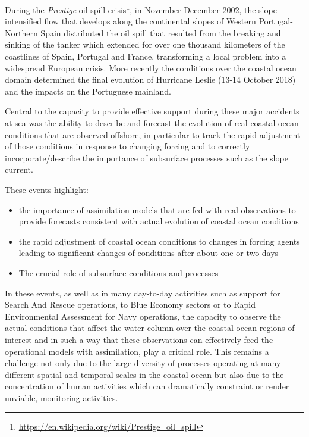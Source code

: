 During the \emph{Prestige} oil spill
crisis\footnote{\url{https://en.wikipedia.org/wiki/Prestige_oil_spill}},
in November-December 2002, the slope intensified flow that develops
along the continental slopes of Western Portugal-Northern Spain
distributed the oil spill that resulted from the breaking and sinking
of the tanker which extended for over one thousand kilometers of the
coastlines of Spain, Portugal and France, transforming a local problem
into a widespread European crisis. More recently the conditions over
the coastal ocean domain determined the final evolution of Hurricane
Leslie (13-14 October 2018) and the impacts on the Portuguese
mainland.
 
Central to the capacity to provide effective support during these
major accidents at sea was the ability to describe and forecast the
evolution of real coastal ocean conditions that are observed offshore,
in particular to track the rapid adjustment of those conditions in
response to changing forcing and to correctly incorporate/describe the
importance of subsurface processes such as the slope current.
 
These events highlight:

\begin{itemize}[noitemsep,topsep=0pt,parsep=0pt,partopsep=0pt]
  
\item the importance of assimilation models that are fed with real
  observations to provide forecasts consistent with actual evolution
  of coastal ocean conditions

\item the rapid adjustment of coastal ocean conditions to changes in
  forcing agents leading to significant changes of conditions after
  about one or two days

\item The crucial role of subsurface conditions and processes
 
\end{itemize}

In these events, as well as in many day-to-day activities such as
support for Search And Rescue operations, to Blue Economy sectors or
to Rapid Environmental Assessment for Navy operations, the capacity to
observe the actual conditions that affect the water column over the
coastal ocean regions of interest and in such a way that these
observations can effectively feed the operational models with
assimilation, play a critical role. This remains a challenge not only
due to the large diversity of processes operating at many different
spatial and temporal scales in the coastal ocean but also due to the
concentration of human activities which can dramatically constraint or
render unviable, monitoring activities.

